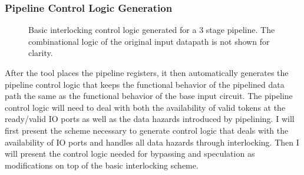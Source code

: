 \subsubsection{Pipeline Control Logic Generation}
\label{section:controlLogicGen}

\begin{figure}
	\centering
    \caption{Basic interlocking control logic generated for a 3 stage pipeline. The combinational logic of the original input datapath is not shown for clarity.}
	\label{fig:ctrlLogic}
\end{figure}

After the tool places the pipeline registers, it then automatically generates the pipeline control logic that keeps the functional behavior of the pipelined data path the same as the functional behavior of the base input circuit. The pipeline control logic will need to deal with both the availability of valid tokens at the ready/valid IO ports as well as the data hazards introduced by pipelining. I will first present the scheme necessary to generate control logic that deals with the availability of IO ports and handles all data hazards through interlocking. Then I will present the control logic needed for bypassing and speculation as modifications on top of the basic interlocking scheme.

